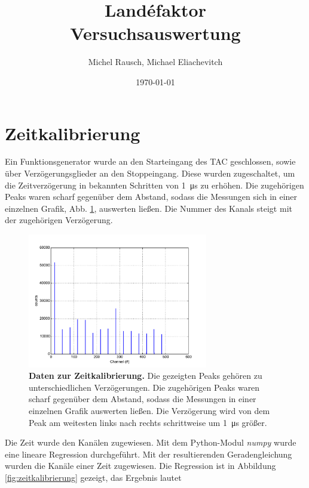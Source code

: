 \documentclass[a4paper,ngerman]{scrartcl}
\title{Landéfaktor\\Versuchsauswertung}
\date{\today}
\author{Michel Rausch, Michael Eliachevitch}
\begin{document}
\maketitle
\tableofcontents
\newpage

\section{Zeitkalibrierung}

Ein Funktionsgenerator wurde an den Starteingang des TAC geschlossen, sowie über Verzögerungsglieder an den Stoppeingang. Diese wurden zugeschaltet, um die Zeitverzögerung in bekannten Schritten von \SI{1}{\micro\second} zu erhöhen. Die zugehörigen Peaks waren scharf gegenüber dem Abstand, sodass die Messungen sich in einer einzelnen Grafik, Abb. \ref{fig:zeitkalibrierung_hist}, auswerten ließen. Die Nummer des Kanals steigt mit der zugehörigen Verzögerung. 

\begin{figure}[tb!]
\centering
\includegraphics[width=0.7\textwidth]{abbildungen/zeitkalibrierung_hist.pdf}
\caption[Daten zur Zeitkalibrierung]{\textbf{Daten zur Zeitkalibrierung.} Die gezeigten Peaks gehören zu unterschiedlichen Verzögerungen. Die zugehörigen Peaks waren scharf gegenüber dem Abstand, sodass die Messungen in einer einzelnen Grafik auswerten ließen. Die Verzögerung wird von dem Peak am weitesten links nach rechts schrittweise um \SI{1}{\micro\second} größer.}
\label{fig:zeitkalibrierung_hist}
\end{figure}


Die Zeit wurde den Kanälen zugewiesen. Mit dem Python-Modul \emph{numpy} wurde eine lineare Regression durchgeführt. Mit der resultierenden Geradengleichung wurden die Kanäle einer Zeit zugewiesen. Die Regression ist in Abbildung \ref{fig:zeitkalibrierung} gezeigt, das Ergebnis lautet
\end{document}
